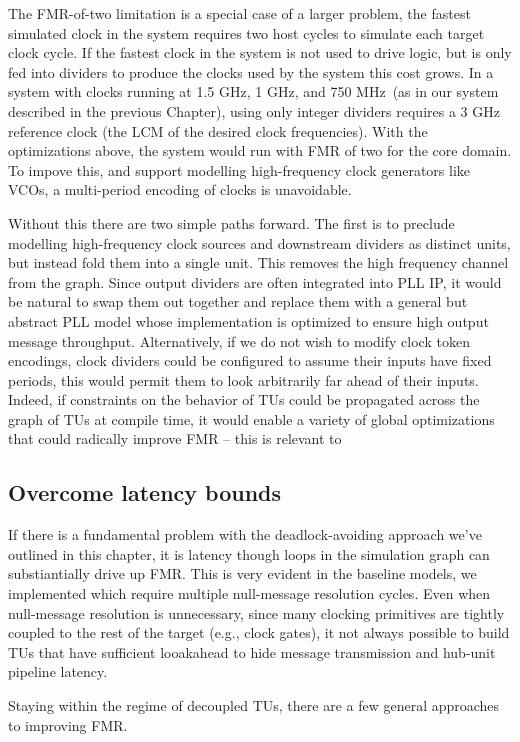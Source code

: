 The FMR-of-two limitation is a special case of a larger problem, the fastest
simulated clock in the system requires two host cycles to simulate each target
clock cycle. If the fastest clock in the system is not used to drive logic, but
is only fed into dividers to produce the clocks used by the system this cost
grows. In a system with clocks running at 1.5 GHz, 1 GHz, and 750 MHz~(as in
our system described in the previous Chapter), using only integer dividers
requires a 3 GHz reference clock (the LCM of the desired clock frequencies).
With the optimizations above, the system would run with FMR of two for the core
domain. To impove this, and support modelling high-frequency clock generators
like VCOs, a multi-period encoding of clocks is unavoidable.

Without this there are two simple paths forward. The first is to preclude
modelling high-frequency clock sources and downstream dividers as distinct
units, but instead fold them into a single unit.  This removes the high
frequency channel from the graph. Since output dividers are often integrated
into PLL IP, it would be natural to swap them out together and replace them
with a general but abstract PLL model whose implementation is optimized to
ensure high output message throughput. Alternatively, if we do not wish to
modify clock token encodings, clock dividers could be configured to assume
their inputs have fixed periods, this would permit them to look arbitrarily far
ahead of their inputs. Indeed, if constraints on the behavior of TUs could be
propagated across the graph of TUs at compile time, it would enable a variety
of global optimizations that could radically improve FMR -- this is relevant to

\subsection{Overcome latency bounds}
If there is a fundamental problem with the deadlock-avoiding approach we've
outlined in this chapter, it is latency though loops in the simulation graph can substiantially drive up
FMR. This is very evident in the baseline models, we implemented which require multiple null-message resolution cycles.
Even when null-message resolution is unnecessary, since many clocking
primitives are tightly coupled to the rest of the target (e.g., clock gates),
it not always possible to build TUs that have sufficient looakahead to
hide message transmission and hub-unit pipeline latency.

Staying within the regime of decoupled TUs, there are a few general approaches
to improving FMR.

